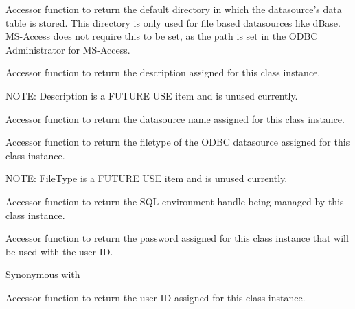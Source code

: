 
Accessor function to return the default directory in which the datasource's data
table is stored.  This directory is only used for file based datasources like
dBase.  MS-Access does not require this to be set, as the path is set in the
ODBC Administrator for MS-Access.

\label{wxdbconnectinfgetdescription}


Accessor function to return the description assigned for this class
instance.

NOTE: Description is a FUTURE USE item and is unused currently.

\label{wxdbconnectinfgetdsn}


Accessor function to return the datasource name assigned for this class
instance.

\label{wxdbconnectinfgetfiletype}


Accessor function to return the filetype of the ODBC datasource assigned for
this class instance.

NOTE: FileType is a FUTURE USE item and is unused currently.

\label{wxdbconnectinfgethenv}


Accessor function to return the SQL environment handle being managed
by this class instance.

\label{wxdbconnectinfgetpassword}


Accessor function to return the password assigned for this class
instance that will be used with the user ID.

Synonymous with 

\label{wxdbconnectinfgetuid}


Accessor function to return the user ID assigned for this class
instance.

